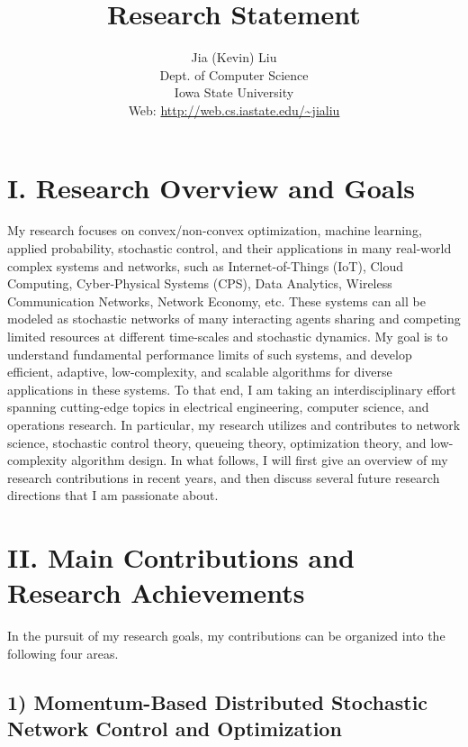 \documentclass[10pt]{article}
\title{{\bf Research Statement}}
\author{Jia (Kevin) Liu \\
{\small Dept. of Computer Science}\\
{\small Iowa State University}\\
{\small Web: \url{http://web.cs.iastate.edu/~jialiu}}
}
\date{}
\theoremstyle{plain} \numberwithin{equation}{section}
\theoremstyle{definition}
\begin{document}
\maketitle



\section*{I. Research Overview and Goals}

My research focuses on convex/non-convex optimization, machine learning, applied probability,
stochastic control, and their applications in many real-world complex systems and networks, such as Internet-of-Things (IoT),  Cloud Computing, Cyber-Physical Systems (CPS), Data Analytics, Wireless Communication Networks, Network Economy, etc. 
These systems can all be modeled as stochastic networks of many interacting agents sharing and competing limited resources at different time-scales and stochastic dynamics. 
My goal is to understand fundamental performance limits of such systems, and develop efficient, adaptive, low-complexity, and scalable algorithms for diverse applications in these systems. 
To that end, I am taking an interdisciplinary effort spanning cutting-edge topics in electrical engineering, computer science, and operations research.
In particular, my research utilizes and contributes to network science, stochastic control theory, queueing theory, optimization theory, and low-complexity algorithm design. 
In what follows, I will first give an overview of my research contributions in recent years, and then discuss several future research directions that I am passionate about.




\section*{II. Main Contributions and Research Achievements}

In the pursuit of my research goals, my contributions can be organized into the following four areas.



\subsection*{1) Momentum-Based Distributed Stochastic Network Control and Optimization \cite{Liu16:HeavyBall_INFOCOM,Liu16:Nesterovian,Liu16:CIF_Grant}}
\end{document}
